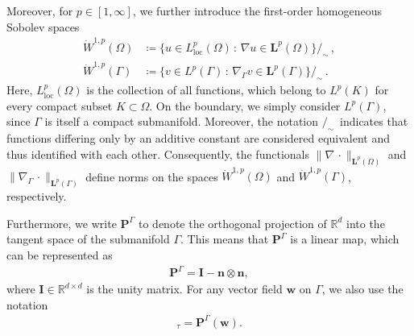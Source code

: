 \documentclass[11pt,reqno]{amsart}
\theoremstyle{remark}
\numberwithin{equation}{section}
\newcommand{\norm}[1]{\| #1 \|}
\newcommand{\R}{\mathbb R}
\newcommand{\n}{\mathbf{n}}
\newcommand{\Grad}{\nabla}
\newcommand{\Gradg}{\nabla_\Ga}
\newcommand{\Ga}{\Gamma}
\newcommand{\bw}{\mathbf w}
\begin{document}
Moreover, for $p\in[1,\infty]$, we further introduce the first-order homogeneous Sobolev spaces
\begin{align*}
    \dot W^{1,p}(\Omega) 
    &\coloneqq
    \big\{ u \in L^p_\mathrm{loc}(\Omega) 
    \,:\, \Grad u \in \mathbf L^p(\Omega) \big\}\big/_{\sim} \,,
    \\
    \dot W^{1,p}(\Gamma) 
    &\coloneqq
    \big\{ v \in L^p(\Gamma) 
    \,:\, \Gradg v \in \mathbf L^p(\Gamma) \big\}\big/_{\sim} \,.
\end{align*}
Here, $L^p_\mathrm{loc}(\Omega)$ is the collection of all functions, which belong to $L^p(K)$ for every compact subset $K\subset \Omega$. On the boundary, we simply consider $L^p(\Gamma)$, since $\Gamma$ is itself a compact submanifold.
Moreover, the notation $/_{\sim}\,$ indicates that functions differing only by an additive constant are considered equivalent and thus identified with each other. Consequently, the functionals ${\norm{\Grad\,\cdot}_{\mathbf L^p(\Omega)}}$ and ${\norm{\Gradg\,\cdot}_{\mathbf L^p(\Gamma)}}$ define norms on the spaces $\dot W^{1,p}(\Omega)$ and $\dot W^{1,p}(\Gamma)$, respectively.

Furthermore, we write $\mathbf{P}^\Gamma$ to denote the orthogonal projection of $\R^d$ into the tangent space of the submanifold $\Gamma$.
This means that $\mathbf{P}^\Gamma$ is a linear map, which can be represented as
\begin{align*}
    \mathbf{P}^\Gamma = \mathbf{I} - \n\otimes\n,
\end{align*}
where $\mathbf{I}\in\R^{d\times d}$ is the unity matrix.
For any vector field $\bw$ on $\Gamma$, we also use the notation
\begin{align*}
    [\bw]_\tau = \mathbf{P}^\Gamma(\bw).
\end{align*}
\end{document}
